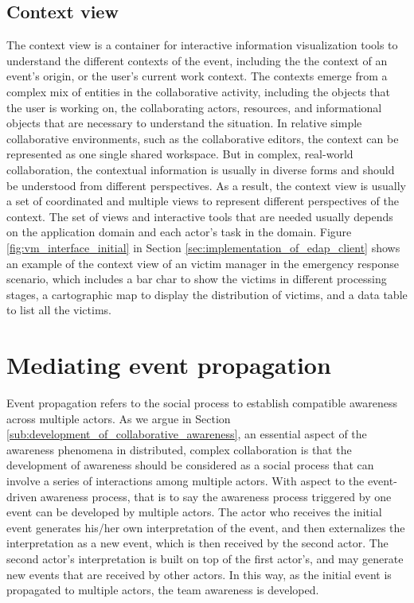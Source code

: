 \subsection{Context view} %
\label{sub:context_view}
The context view is a container for interactive information visualization tools to understand the different contexts of the event, including the the context of an event's origin, or the user's current work context. The contexts emerge from a complex mix of entities in the collaborative activity, including the objects that the user is working on, the collaborating actors, resources, and informational objects that are necessary to understand the situation. In relative simple collaborative environments, such as the collaborative editors, the context can be represented as one single shared workspace. But in complex, real-world collaboration, the contextual information is usually in diverse forms and should be understood from different perspectives. As a result, the context view is usually a set of coordinated and multiple views to represent different perspectives of the context. The set of views and interactive tools that are needed usually depends on the application domain and each actor's task in the domain. Figure \ref{fig:vm_interface_initial} in Section \ref{sec:implementation_of_edap_client} shows an example of the context view of an victim manager in the emergency response scenario, which includes a bar char to show the victims in different processing stages, a cartographic map to display the distribution of victims, and a data table to list all the victims. 

\section{Mediating event propagation} %
\label{sec:mediating_event_propagation}
Event propagation refers to the social process to establish compatible awareness across multiple actors. As we argue in Section \ref{sub:development_of_collaborative_awareness}, an essential aspect of the awareness phenomena in distributed, complex collaboration is that the development of awareness should be considered as a social process that can involve a series of interactions among multiple actors. With aspect to the event-driven awareness process, that is to say the awareness process triggered by one event can be developed by multiple actors. The actor who receives the initial event generates his/her own interpretation of the event, and then externalizes the interpretation as a new event, which is then received by the second actor. The second actor's interpretation is built on top of the first actor's, and may generate new events that are received by other actors. In this way, as the initial event is propagated to multiple actors, the team awareness is developed.


